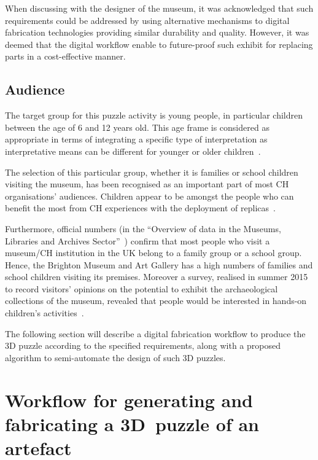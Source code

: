 \documentclass[acmlarge,screen,dvipsnames]{acmart}
\begin{document}
When discussing with the designer of the museum, it was acknowledged
that such requirements could be addressed by using alternative
mechanisms to digital fabrication technologies providing similar
durability and quality. However, it was deemed that the digital
workflow  enable to future-proof such exhibit for replacing parts
in a cost-effective manner.

\subsection{Audience}

The target group for this puzzle activity is young people, in
particular children between the age of 6 and 12 years old. This age
frame is considered as appropriate in terms of integrating a specific
type of interpretation as interpretative means can be different for
younger or older children~\cite{Tilden1977}.

The selection of this particular group, whether it is families or
school children visiting the museum, has been recognised as an
important part of most CH organisations' audiences. Children appear to
be amongst the people who can benefit the most from CH experiences
with the deployment of replicas~\cite{Cabral2013,Neely2015,Miles2015}.

Furthermore, official numbers (in the ``Overview of data in the
Museums, Libraries and Archives Sector''~\cite{Matty2004}) confirm
that most people who visit a museum/CH institution in the UK belong to
a family group or a school group. Hence, the Brighton Museum and Art
Gallery has a high numbers of families and school children visiting
its premises. Moreover a survey, realised in summer 2015 to record
visitors' opinions on the potential to exhibit the archaeological
collections of the museum, revealed that people would be interested in
hands-on children's activities~\cite{RoyalPavilionandMuseums2015}.

The following section will describe a digital fabrication workflow to
produce the 3D puzzle according to the specified requirements, along
with a proposed algorithm to semi-automate the design of such 3D
puzzles.

\section{Workflow for generating and fabricating a
  3D~puzzle of an artefact}
\label{workflow}
\end{document}
